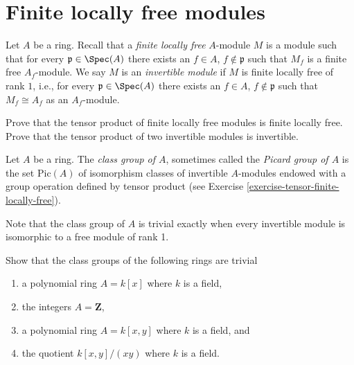 \section{Finite locally free modules}
\label{section-finite-locally-free}

\begin{definition}
\label{definition-finite-locally-free}
Let $A$ be a ring. Recall that a {\it finite locally free} $A$-module
$M$ is a module such that for every ${\mathfrak p} \in \Spec(A)$
there exists an
$f\in A$, $f \not \in {\mathfrak p}$ such that $M_f$ is a finite free
$A_f$-module. We say $M$ is an {\it invertible module} if
$M$ is finite locally free of rank $1$, i.e., for every
${\mathfrak p} \in \Spec(A)$ there exists an
$f\in A$, $f \not \in \mathfrak p$ such that $M_f \cong A_f$
as an $A_f$-module.
\end{definition}

\begin{exercise}
\label{exercise-tensor-finite-locally-free}
Prove that the tensor product of finite locally free modules
is finite locally free. Prove that the tensor product of two
invertible modules is invertible.
\end{exercise}

\begin{definition}
\label{definition-class-group}
Let $A$ be a ring. The {\it class group of $A$}, sometimes called
the {\it Picard group of $A$} is the set $\text{Pic}(A)$
of isomorphism classes of invertible $A$-modules endowed with
a group operation defined by tensor product (see
Exercise \ref{exercise-tensor-finite-locally-free}).
\end{definition}

\noindent
Note that the class group of $A$ is trivial exactly when every invertible
module is isomorphic to a free module of rank 1.

\begin{exercise}
\label{exercise-class-group-trivial}
Show that the class groups of the following rings are trivial
\begin{enumerate}
\item a polynomial ring $A = k[x]$ where $k$ is a field,
\item the integers $A = \mathbf{Z}$,
\item a polynomial ring $A = k[x, y]$ where $k$ is a field, and
\item the quotient $k[x, y]/(xy)$ where $k$ is a field.
\end{enumerate}
\end{exercise}

